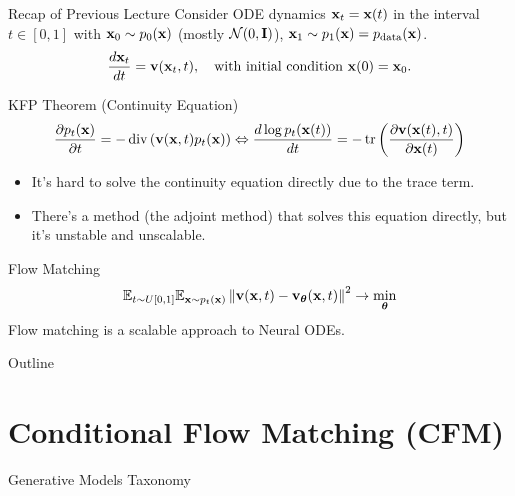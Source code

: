 \documentclass{beamer}
\begin{document}
\begin{frame}{Recap of Previous Lecture}
	Consider ODE dynamics $\mathbf{x}_t = \mathbf{x}(t)$ in the interval $t \in [0, 1]$ with $\mathbf{x}_0 \sim p_0(\mathbf{x})$ (mostly $\mathcal{N}(0, \mathbf{I})$), $\mathbf{x}_1 \sim p_1(\mathbf{x}) = p_{\text{data}}(\mathbf{x})$.
	\[
		\frac{d \mathbf{x}_t}{dt} = \mathbf{v} (\mathbf{x}_t, t),  \quad \text{with initial condition } \mathbf{x}(0) = \mathbf{x}_0.
	\]
	\vspace{-0.5cm}
	\begin{block}{KFP Theorem (Continuity Equation)}
		\vspace{-0.5cm}
		\[
			\frac{\partial p_t(\mathbf{x})}{\partial t} = - \operatorname{div}\left(\mathbf{v}(\mathbf{x}, t) p_t(\mathbf{x})\right) \Leftrightarrow \frac{d \log p_t(\mathbf{x}(t))}{d t} = - \operatorname{tr} \left( \frac{\partial \mathbf{v}(\mathbf{x}(t), t)}{\partial \mathbf{x}(t)} \right)
		\]
		\vspace{-0.5cm}
	\end{block}
	\begin{itemize}
		\item It's hard to solve the continuity equation directly due to the trace term.
		\item There's a method (the adjoint method) that solves this equation directly, but it's unstable and unscalable.
	\end{itemize}
	\begin{block}{Flow Matching}
		\vspace{-0.3cm}
		\[
			\mathbb{E}_{t \sim U[0, 1]} \mathbb{E}_{\mathbf{x} \sim p_t(\mathbf{x})}\left\| \mathbf{v}(\mathbf{x}, t) - \mathbf{v}_{\boldsymbol{\theta}}(\mathbf{x}, t) \right\|^2 \rightarrow \min_{\boldsymbol{\theta}}
		\]
		\vspace{-0.3cm}
		Flow matching is a scalable approach to Neural ODEs.
	\end{block}
\end{frame}
\begin{frame}{Outline}
	\tableofcontents
\end{frame}
\section{Conditional Flow Matching (CFM)}
\begin{frame}{Generative Models Taxonomy}
\end{frame}
\end{document}
